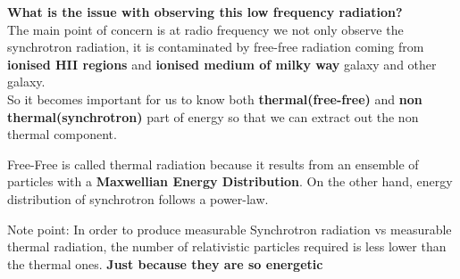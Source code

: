 \documentclass[12pt]{report}
\newcommand{\cbox}{tcolorbox}
\begin{document}
\textbf{What is the issue with observing this low frequency radiation?}\\
The main point of concern is at radio frequency we not only observe the synchrotron radiation, it is contaminated by free-free radiation coming from \textbf{ionised HII regions} and \textbf{ionised medium of milky way} galaxy and other galaxy.\\

So it becomes important for us to know both \textbf{thermal(free-free)} and \textbf{non thermal(synchrotron)} part of energy so that we can extract out the non thermal component.\\
\begin{\cbox}
Free-Free is called thermal radiation because it results from an ensemble of particles with a \textbf{Maxwellian Energy Distribution}. On the other hand, energy distribution of synchrotron follows a power-law.
\end{\cbox}
\begin{\cbox}
Note point: In order to produce measurable Synchrotron radiation vs measurable thermal radiation, the number of relativistic particles required is less lower than the thermal ones. \textbf{Just because they are so energetic} 
\end{\cbox}
\end{document}
